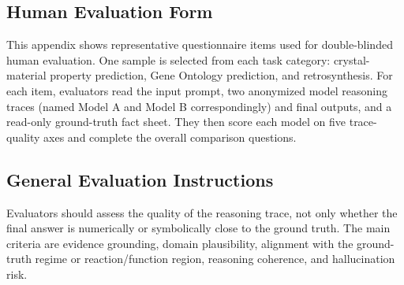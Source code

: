 \begin{appendices}
 
 
 
 
 
 
 
 
 
 
 
 
 
 
 
 
 
 
 
 
 
 
 
 
 
 
 
 
 
 
 
 
 
 


\clearpage

\section{Human Evaluation Form}\label{secC1}

This appendix shows representative questionnaire items used for double-blinded human evaluation.
One sample is selected from each task category: crystal-material property
prediction, Gene Ontology prediction, and retrosynthesis. For each item,
evaluators read the input prompt, two anonymized model reasoning traces (named Model A and Model B correspondingly) and final
outputs, and a read-only ground-truth fact sheet. They then score each model on
five trace-quality axes and complete the overall comparison questions.

\subsection{General Evaluation Instructions}

Evaluators should assess the quality of the reasoning trace, not only whether
the final answer is numerically or symbolically close to the ground truth. The
main criteria are evidence grounding, domain plausibility, alignment with the
ground-truth regime or reaction/function region, reasoning coherence, and
hallucination risk.

 
 
 
 
 
 
 
 
 
 

 
 
 
 
 
 

\end{appendices}
